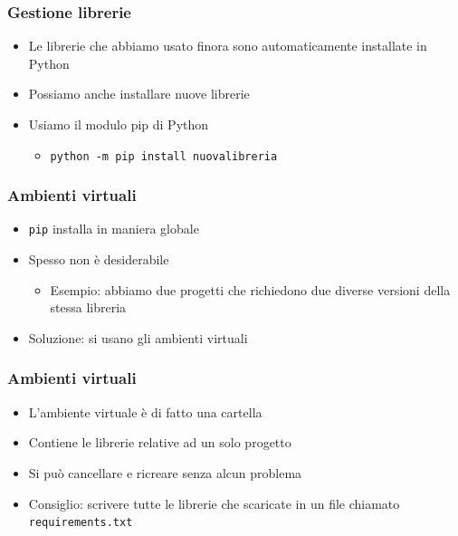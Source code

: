 
\begin{contentframe}
    \frametitle{Gestione librerie}

    \begin{itemize}
        \item Le librerie che abbiamo usato finora sono automaticamente installate in Python
        \item Possiamo anche installare nuove librerie

        \bigskip
        \item Usiamo il modulo pip di Python
        \begin{itemize}
            \item \texttt{python -m pip install nuovalibreria}
        \end{itemize}
    \end{itemize}
\end{contentframe}

\begin{contentframe}
    \frametitle{Ambienti virtuali}

    \begin{itemize}
        \item \texttt{pip} installa in maniera globale
        \item Spesso non è desiderabile
        \begin{itemize}
            \item Esempio: abbiamo due progetti che richiedono due diverse versioni della stessa libreria
        \end{itemize}

        \bigskip
        \item Soluzione: si usano gli ambienti virtuali
    \end{itemize}
\end{contentframe}

\begin{contentframe}
    \frametitle{Ambienti virtuali}

    \begin{itemize}
        \item L'ambiente virtuale è di fatto una cartella
        \item Contiene le librerie relative ad un solo progetto
        \item Si può cancellare e ricreare senza alcun problema

        \bigskip
        \item Consiglio: scrivere tutte le librerie che scaricate in un file chiamato \texttt{requirements.txt}
    \end{itemize}
\end{contentframe}

